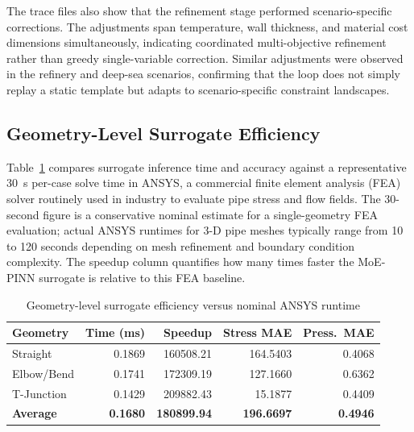 \documentclass[conference]{IEEEtran}
\begin{document}
The trace files also show that the refinement stage performed scenario-specific corrections. The adjustments span temperature, wall thickness, and material cost dimensions simultaneously, indicating coordinated multi-objective refinement rather than greedy single-variable correction. Similar adjustments were observed in the refinery and deep-sea scenarios, confirming that the loop does not simply replay a static template but adapts to scenario-specific constraint landscapes.
 
\subsection{Geometry-Level Surrogate Efficiency}

Table~\ref{tab:geometry_perf} compares surrogate inference time and accuracy against a representative \SI{30}{\second} per-case solve time in ANSYS, a commercial finite element analysis (FEA) solver routinely used in industry to evaluate pipe stress and flow fields. The 30-second figure is a conservative nominal estimate for a single-geometry FEA evaluation; actual ANSYS runtimes for 3-D pipe meshes typically range from 10 to 120 seconds depending on mesh refinement and boundary condition complexity. The speedup column quantifies how many times faster the MoE-PINN surrogate is relative to this FEA baseline.
 
\begin{table}[!t]

\caption{Geometry-level surrogate efficiency versus nominal ANSYS runtime}

\label{tab:geometry_perf}

\centering

\setlength{\tabcolsep}{3.5pt}

\begin{tabular}{lrrrr}

\toprule

\textbf{Geometry} & \textbf{Time (ms)} & \textbf{Speedup} & \textbf{Stress MAE} & \textbf{Press.\ MAE} \\

\midrule

Straight    & 0.1869 & 160508.21 & 164.5403 & 0.4068 \\

Elbow/Bend  & 0.1741 & 172309.19 & 127.1660 & 0.6362 \\

T-Junction  & 0.1429 & 209882.43 &  15.1877 & 0.4409 \\

\midrule

\textbf{Average} & \textbf{0.1680} & \textbf{180899.94} & \textbf{196.6697} & \textbf{0.4946} \\

\bottomrule

\end{tabular}

\end{table}
 
\end{document}
